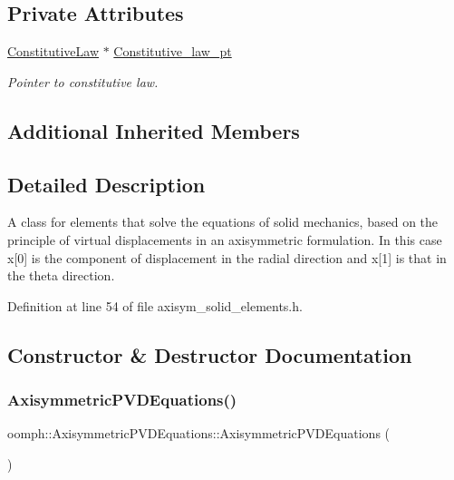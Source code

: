 \subsection*{Private Attributes}
\begin{DoxyCompactItemize}
\item 
\hyperlink{classoomph_1_1ConstitutiveLaw}{Constitutive\+Law} $\ast$ \hyperlink{classoomph_1_1AxisymmetricPVDEquations_a69bc689b112a9b24de68315296ab9c87}{Constitutive\+\_\+law\+\_\+pt}
\begin{DoxyCompactList}\small\item\em Pointer to constitutive law. \end{DoxyCompactList}\end{DoxyCompactItemize}
\subsection*{Additional Inherited Members}


\subsection{Detailed Description}
A class for elements that solve the equations of solid mechanics, based on the principle of virtual displacements in an axisymmetric formulation. In this case x\mbox{[}0\mbox{]} is the component of displacement in the radial direction and x\mbox{[}1\mbox{]} is that in the theta direction. 

Definition at line 54 of file axisym\+\_\+solid\+\_\+elements.\+h.



\subsection{Constructor \& Destructor Documentation}
\mbox{\label{classoomph_1_1AxisymmetricPVDEquations_acb73b32e5b0b2a80b164a445c2c8ac9a}} 
\subsubsection{\texorpdfstring{Axisymmetric\+P\+V\+D\+Equations()}{AxisymmetricPVDEquations()}}
{\footnotesize\ttfamily oomph\+::\+Axisymmetric\+P\+V\+D\+Equations\+::\+Axisymmetric\+P\+V\+D\+Equations (\begin{DoxyParamCaption}{ }\end{DoxyParamCaption})\hspace{0.3cm}{\ttfamily [inline]}}



